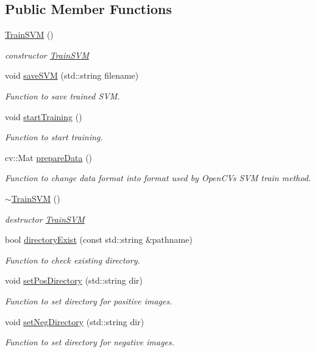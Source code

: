 \subsection*{Public Member Functions}
\begin{DoxyCompactItemize}
\item 
\hyperlink{classTrainSVM_a2d30e456094a3eee9aae4aad2023a672}{Train\+S\+VM} ()
\begin{DoxyCompactList}\small\item\em constructor \hyperlink{classTrainSVM}{Train\+S\+VM} \end{DoxyCompactList}\item 
void \hyperlink{classTrainSVM_a4f869e7382bf67edfee56745e3dd46c7}{save\+S\+VM} (std\+::string filename)
\begin{DoxyCompactList}\small\item\em Function to save trained S\+VM. \end{DoxyCompactList}\item 
void \hyperlink{classTrainSVM_aa419880642d9cfb2ef2c094f34971f0b}{start\+Training} ()
\begin{DoxyCompactList}\small\item\em Function to start training. \end{DoxyCompactList}\item 
cv\+::\+Mat \hyperlink{classTrainSVM_a63344677aea94f0e963263619fa5c98f}{prepare\+Data} ()
\begin{DoxyCompactList}\small\item\em Function to change data format into format used by Open\+CV\textquotesingle{}s S\+VM train method. \end{DoxyCompactList}\item 
\hyperlink{classTrainSVM_acd68b7bd056d7497feb97185b6c59f76}{$\sim$\+Train\+S\+VM} ()
\begin{DoxyCompactList}\small\item\em destructor \hyperlink{classTrainSVM}{Train\+S\+VM} \end{DoxyCompactList}\item 
bool \hyperlink{classTrainSVM_a2bd0684e200406c43d3db42e5bda8c52}{directory\+Exist} (const std\+::string \&pathname)
\begin{DoxyCompactList}\small\item\em Function to check existing directory. \end{DoxyCompactList}\item 
void \hyperlink{classTrainSVM_adb7867f2a75e891513ed0c8f95a87642}{set\+Pos\+Directory} (std\+::string dir)
\begin{DoxyCompactList}\small\item\em Function to set directory for positive images. \end{DoxyCompactList}\item 
void \hyperlink{classTrainSVM_ae5eb68ceb9030e0a0cbc13704452f19f}{set\+Neg\+Directory} (std\+::string dir)
\begin{DoxyCompactList}\small\item\em Function to set directory for negative images. \end{DoxyCompactList}\end{DoxyCompactItemize}
